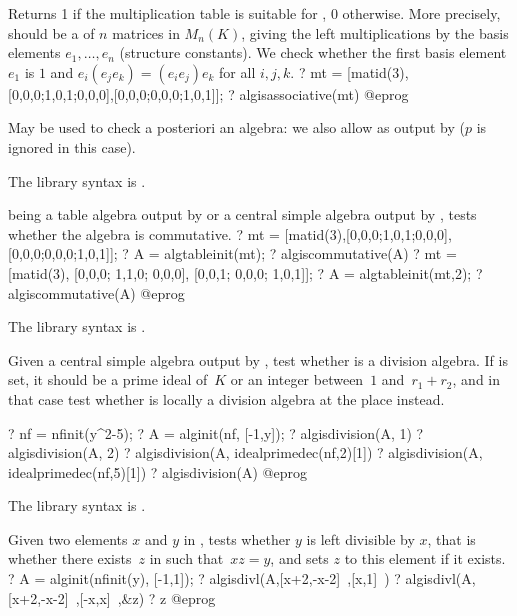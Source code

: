 \label{se:algisassociative}
Returns 1 if the multiplication table  is suitable for
, 0 otherwise. More precisely,  should be
a  of $n$ matrices in $M_n(K)$, giving the left multiplications
by the basis elements $e_1, \dots, e_n$ (structure constants).
We check whether the first basis element $e_1$ is $1$ and $e_i(e_je_k) =
(e_ie_j)e_k$ for all $i,j,k$.
\bprog
 ? mt = [matid(3),[0,0,0;1,0,1;0,0,0],[0,0,0;0,0,0;1,0,1]];
 ? algisassociative(mt)
@eprog

May be used to check a posteriori an algebra: we also allow  as
output by  ($p$ is ignored in this case).

The library syntax is .

\label{se:algiscommutative}
 being a table algebra output by  or a central
simple algebra output by , tests whether the algebra  is
commutative.
\bprog
? mt = [matid(3),[0,0,0;1,0,1;0,0,0],[0,0,0;0,0,0;1,0,1]];
? A = algtableinit(mt);
? algiscommutative(A)
? mt = [matid(3), [0,0,0; 1,1,0; 0,0,0], [0,0,1; 0,0,0; 1,0,1]];
? A = algtableinit(mt,2);
? algiscommutative(A)
@eprog

The library syntax is .

\label{se:algisdivision}
Given a central simple algebra  output by , test
whether  is a division algebra. If  is set, it should be a
prime ideal of~$K$ or an integer between~$1$ and~$r_1+r_2$, and in that case
test whether  is locally a division algebra at the place 
instead.

\bprog
? nf = nfinit(y^2-5);
? A = alginit(nf, [-1,y]);
? algisdivision(A, 1)
? algisdivision(A, 2)
? algisdivision(A, idealprimedec(nf,2)[1])
? algisdivision(A, idealprimedec(nf,5)[1])
? algisdivision(A)
@eprog

The library syntax is .

\label{se:algisdivl}
Given two elements $x$ and $y$ in , tests whether $y$ is left
divisible by $x$, that is whether there exists~$z$ in  such
that~$xz=y$, and sets $z$ to this element if it exists.
\bprog
? A = alginit(nfinit(y), [-1,1]);
? algisdivl(A,[x+2,-x-2]~,[x,1]~)
? algisdivl(A,[x+2,-x-2]~,[-x,x]~,&z)
? z
@eprog

